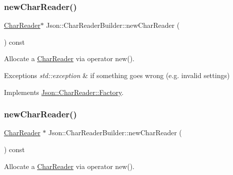 \subsubsection{\texorpdfstring{new\+Char\+Reader()}{newCharReader()}\hspace{0.1cm}{\footnotesize\ttfamily [1/2]}}
{\footnotesize\ttfamily \hyperlink{class_json_1_1_char_reader}{Char\+Reader}$\ast$ Json\+::\+Char\+Reader\+Builder\+::new\+Char\+Reader (\begin{DoxyParamCaption}{ }\end{DoxyParamCaption}) const\hspace{0.3cm}{\ttfamily [virtual]}}



Allocate a \hyperlink{class_json_1_1_char_reader}{Char\+Reader} via operator new(). 


\begin{DoxyExceptions}{Exceptions}
{\em std\+::exception} & if something goes wrong (e.\+g. invalid settings) \\
\hline
\end{DoxyExceptions}


Implements \hyperlink{class_json_1_1_char_reader_1_1_factory_a4c5862a1ffd432372dbe65cf59de98c4}{Json\+::\+Char\+Reader\+::\+Factory}.

\hypertarget{class_json_1_1_char_reader_builder_a3a262fcc76c1eb8eebfd4718fb4e9722}{}\label{class_json_1_1_char_reader_builder_a3a262fcc76c1eb8eebfd4718fb4e9722} 
\subsubsection{\texorpdfstring{new\+Char\+Reader()}{newCharReader()}\hspace{0.1cm}{\footnotesize\ttfamily [2/2]}}
{\footnotesize\ttfamily \hyperlink{class_json_1_1_char_reader}{Char\+Reader} $\ast$ Json\+::\+Char\+Reader\+Builder\+::new\+Char\+Reader (\begin{DoxyParamCaption}{ }\end{DoxyParamCaption}) const\hspace{0.3cm}{\ttfamily [virtual]}}



Allocate a \hyperlink{class_json_1_1_char_reader}{Char\+Reader} via operator new(). 


